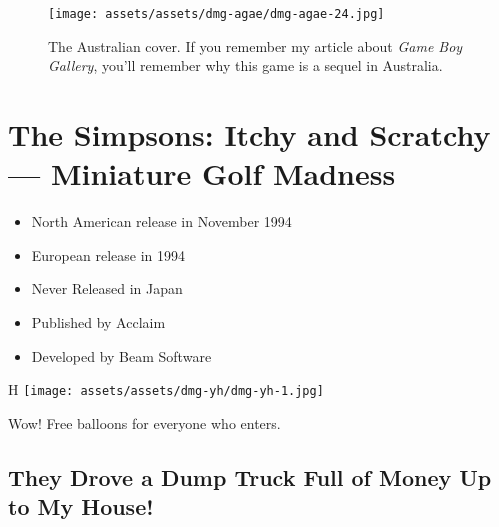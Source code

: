 \documentclass{book}
\begin{document}
\begin{figure}[hbt]
\vskip 10pt
\centering \texttt{[image: assets/assets/dmg-agae/dmg-agae-24.jpg]}\par\pagetwodescription The Australian cover. If you remember my article about \emph{Game Boy Gallery}, you’ll remember why this game is a sequel in Australia.
\vskip 6pt
\end{figure}


\begingroup \chapter*{The Simpsons: Itchy and Scratchy — Miniature Golf Madness} \endgroup

\begin{itemize} \setlength\itemsep{-0.4em}
\item North American release in November 1994
\item European release in 1994
\item Never Released in Japan
\item Published by Acclaim
\item Developed by Beam Software
\end{itemize}\noindent

\begin{wrapfigure}{H}{\linewidth}
\vskip 4pt
\centering \texttt{[image: assets/assets/dmg-yh/dmg-yh-1.jpg]}\par\pagetwodescription Wow! Free balloons for everyone who enters.\end{wrapfigure}
\clearpage

\FloatBarrier\needspace{10mm}\section*{They Drove a Dump Truck Full of Money Up to My House!}\nopagebreak[4]
\end{document}
